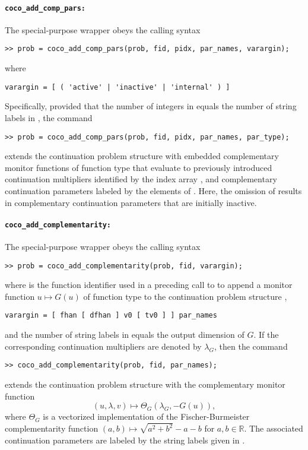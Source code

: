 \paragraph{\texttt{coco\_add\_comp\_pars:}}
The  special-purpose wrapper obeys the calling syntax
\begin{lstlisting}[language=coco-highlight]
>> prob = coco_add_comp_pars(prob, fid, pidx, par_names, varargin);
\end{lstlisting}
where
\begin{lstlisting}[language=coco-highlight]
varargin = [ ( 'active' | 'inactive' | 'internal' ) ]
\end{lstlisting}
Specifically, provided that the number of integers in  equals the number of string labels in , the command
\begin{lstlisting}[language=coco-highlight]
>> prob = coco_add_comp_pars(prob, fid, pidx, par_names, par_type);
\end{lstlisting}
extends the continuation problem structure with embedded complementary monitor functions of function type  that evaluate to previously introduced continuation multipliers identified by the index array , and complementary continuation parameters labeled by the elements of . Here, the omission of  results in complementary continuation parameters that are initially inactive.


\paragraph{\texttt{coco\_add\_complementarity:}}
The  special-purpose wrapper obeys the calling syntax
\begin{lstlisting}[language=coco-highlight]
>> prob = coco_add_complementarity(prob, fid, varargin);
\end{lstlisting}
where  is the function identifier used in a preceding call to  to append a monitor function $u\mapsto G(u)$ of function type  to the continuation problem structure ,
\begin{lstlisting}[language=coco-highlight]
varargin = [ fhan [ dfhan ] v0 [ tv0 ] ] par_names
\end{lstlisting}
and the number of string labels in  equals the output dimension of $G$. If the corresponding continuation multipliers are denoted by $\lambda_G$, then the command
\begin{lstlisting}[language=coco-highlight]
>> coco_add_complementarity(prob, fid, par_names);
\end{lstlisting}
extends the continuation problem structure with the complementary monitor function
\begin{equation}
(u,\lambda,v)\mapsto\Theta_G(\lambda_G,-G(u)),
\end{equation}
where $\Theta_G$ is a vectorized implementation of the Fischer-Burmeister complementarity function $(a,b)\mapsto \sqrt{a^2+b^2}-a-b$ for $a,b\in\mathbb{R}$. The associated continuation parameters are labeled by the string labels given in . 

